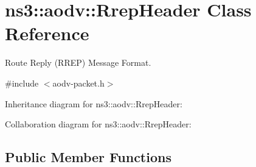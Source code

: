 \hypertarget{classns3_1_1aodv_1_1RrepHeader}{}\section{ns3\+:\+:aodv\+:\+:Rrep\+Header Class Reference}
\label{classns3_1_1aodv_1_1RrepHeader}


Route Reply (R\+R\+EP) Message Format.  




{\ttfamily \#include $<$aodv-\/packet.\+h$>$}



Inheritance diagram for ns3\+:\+:aodv\+:\+:Rrep\+Header\+:


Collaboration diagram for ns3\+:\+:aodv\+:\+:Rrep\+Header\+:
\subsection*{Public Member Functions}
